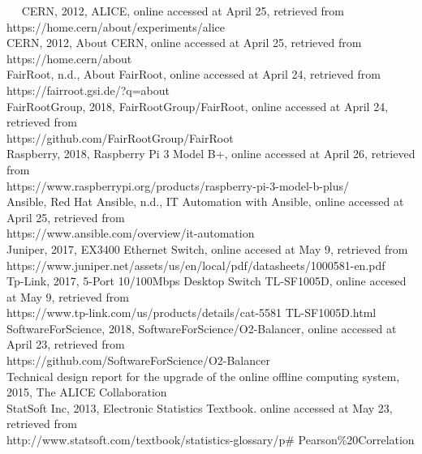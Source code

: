 
~~ CERN, 2012, ALICE, online accessed at April 25, retrieved from \\https://home.cern/about/experiments/alice\\

CERN, 2012, About CERN, online accessed at April 25, retrieved from \\https://home.cern/about\\

FairRoot, n.d., About FairRoot, online accessed at April 24, retrieved from \\https://fairroot.gsi.de/?q=about\\

FairRootGroup, 2018, FairRootGroup/FairRoot, online accessed at April 24, retrieved from \\https://github.com/FairRootGroup/FairRoot\\

Raspberry, 2018, Raspberry Pi 3 Model B+, online accessed at April 26, retrieved from \\https://www.raspberrypi.org/products/raspberry-pi-3-model-b-plus/\\

Ansible, Red Hat Ansible, n.d., IT Automation with Ansible, online accessed at April 25, retrieved from \\https://www.ansible.com/overview/it-automation\\

Juniper, 2017, EX3400 Ethernet Switch, online accesed at May 9, retrieved from \\https://www.juniper.net/assets/us/en/local/pdf/datasheets/1000581-en.pdf\\

Tp-Link, 2017, 5-Port 10/100Mbps Desktop Switch TL-SF1005D, online accesed at May 9, retrieved from \\https://www.tp-link.com/us/products/details/cat-5581 TL-SF1005D.html\\

SoftwareForScience, 2018, SoftwareForScience/O2-Balancer, online accessed at April 23, retrieved from \\https://github.com/SoftwareForScience/O2-Balancer\\

Technical design report for the upgrade of the online offline computing system, 2015, The ALICE Collaboration\\

StatSoft Inc, 2013, Electronic Statistics Textbook. online accessed at May 23, retrieved from  \\http://www.statsoft.com/textbook/statistics-glossary/p\# Pearson\%20Correlation